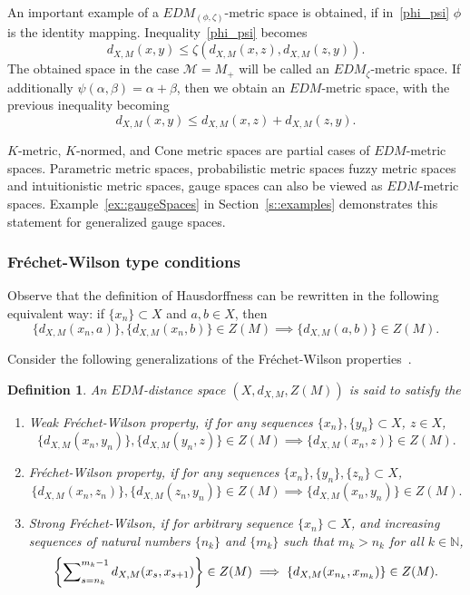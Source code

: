 \documentclass[12pt]{amsart}          %
\newtheorem{definition}{Definition}
\newcommand{\NN}{\mathbb N}
\begin{document}
An important example of a  $EDM_{(\phi,\zeta)}$-metric space is obtained, if in~\eqref{phi_psi}  $\phi$ is the identity mapping. Inequality~\eqref{phi_psi} becomes
$$
d_{X,M}(x,y)\le \zeta (d_{X,M}(x,z),d_{X,M}(z,y)).    
$$
The obtained space in the case $\mathcal{M} = M_+$ will be called an $EDM_\zeta$-metric space.
If additionally  $\psi(\alpha,\beta)=\alpha+\beta$, then we obtain an $EDM$-metric space, with the previous inequality becoming
$$
d_{X,M}(x,y)\le d_{X,M}(x,z)+d_{X,M}(z,y). $$


$K$-metric, $K$-normed, and Cone metric spaces
are partial cases of $EDM$-metric spaces.  Parametric metric spaces,
probabilistic metric spaces
fuzzy metric spaces
and intuitionistic metric spaces,
gauge spaces
can also  be viewed as $EDM$-metric spaces. {Example~\ref{ex::gaugeSpaces} in Section~\ref{s::examples} demonstrates this statement for generalized gauge spaces.}

\subsubsection{Fr\'{e}chet-Wilson type conditions}
Observe that   the definition of Hausdorffness can be rewritten in the following equivalent way: if $\{x_n\}\subset X$ and $a,b\in X$, then
$$
\{d_{X,M}(x_n,a)\},\{d_{X,M}(x_n,b)\}\in Z(M)\implies \{d_{X,M}(a,b)\}\in Z(M).
$$

Consider the following generalizations of the Fr\'{e}chet-Wilson properties~\cite{Wilson}.
\begin{definition}\label{def::FWProps}
An $EDM$-distance space $(X,d_{X,M},Z(M))$ is said to satisfy the 
\begin{enumerate}
    \item Weak Fr\'{e}chet-Wilson property, if for any sequences $\{x_n\},\{y_n\}\subset X$, $z\in X$,
    $$
\{d_{X,M}(x_n,y_{n})\},\{d_{X,M}(y_{n},z)\}\in Z(M)\implies\{d_{X,M}(x_n,z)\}\in Z(M).
$$ 
\item Fr\'{e}chet-Wilson property, if for any sequences $\{ x_n\},\{ y_n\},\{ z_n\}\subset X$, 
$$
\{d_{X,M}(x_n,z_{n})\},\{d_{X,M}(z_{n},y_n)\}\in Z(M)\implies\{d_{X,M}(x_n,y_{n})\}\in Z(M).
$$
\item Strong Fr\'{e}chet-Wilson, if  for arbitrary sequence $\{x_n\}\subset X$,  and increasing sequences of natural numbers $\{n_k\}$ and $\{m_k\}$ such that $m_k> n_k$ for all $k\in\NN$,
$$
\left\{\sum\nolimits\nolimits_{s = n_k}^{m_k-1} d_{X,M}(x_s,x_{s+1})\right\}\in Z(M)\implies\left\{ d_{X,M}(x_{n_k},x_{m_k})\right\}\in Z(M).
$$
\end{enumerate}
\end{definition}
\end{document}
